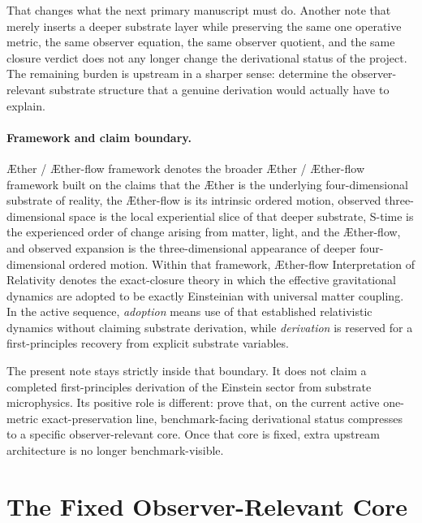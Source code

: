 \documentclass[11pt]{article}
\newcommand{\Aether}{\AE{}ther}
\newcommand{\Aflow}{\AE{}ther-flow}
\newcommand{\TheoryName}{\Aflow{} Interpretation of Relativity}
\newcommand{\TheoryProgram}{\Aether{} / \Aflow{} framework}
\begin{document}
That changes what the next primary manuscript must do. Another note that merely inserts a deeper substrate layer while preserving the same one operative metric, the same observer equation, the same observer quotient, and the same closure verdict does not any longer change the derivational status of the project. The remaining burden is upstream in a sharper sense: determine the observer-relevant substrate structure that a genuine derivation would actually have to explain.

\paragraph{Framework and claim boundary.}
\TheoryProgram{} denotes the broader \Aether{} / \Aflow{} framework built on the claims that the \Aether{} is the underlying four-dimensional substrate of reality, the \Aflow{} is its intrinsic ordered motion, observed three-dimensional space is the local experiential slice of that deeper substrate, S-time is the experienced order of change arising from matter, light, and the \Aflow{}, and observed expansion is the three-dimensional appearance of deeper four-dimensional ordered motion. Within that framework, \TheoryName{} denotes the exact-closure theory in which the effective gravitational dynamics are adopted to be exactly Einsteinian with universal matter coupling. In the active sequence, \emph{adoption} means use of that established relativistic dynamics without claiming substrate derivation, while \emph{derivation} is reserved for a first-principles recovery from explicit substrate variables.

The present note stays strictly inside that boundary. It does not claim a completed first-principles derivation of the Einstein sector from substrate microphysics. Its positive role is different: prove that, on the current active one-metric exact-preservation line, benchmark-facing derivational status compresses to a specific observer-relevant core. Once that core is fixed, extra upstream architecture is no longer benchmark-visible.

\section{The Fixed Observer-Relevant Core}
\end{document}
